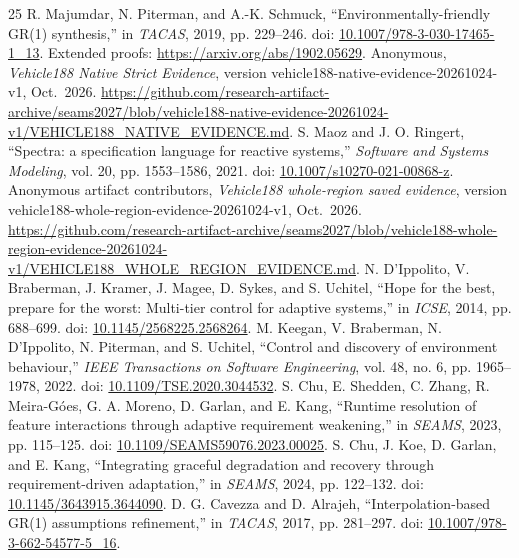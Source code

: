 \begin{thebibliography}{25}
R. Majumdar, N. Piterman, and A.-K. Schmuck, ``Environmentally-friendly GR(1) synthesis,'' in \emph{TACAS}, 2019, pp. 229--246. doi: \href{https://doi.org/10.1007/978-3-030-17465-1_13}{10.1007/978-3-030-17465-1\_13}. Extended proofs: \url{https://arxiv.org/abs/1902.05629}.
Anonymous, \emph{Vehicle188 Native Strict Evidence}, version vehicle188-native-evidence-20261024-v1, Oct.~2026. \url{https://github.com/research-artifact-archive/seams2027/blob/vehicle188-native-evidence-20261024-v1/VEHICLE188_NATIVE_EVIDENCE.md}.
S. Maoz and J. O. Ringert, ``Spectra: a specification language for reactive systems,'' \emph{Software and Systems Modeling}, vol. 20, pp. 1553--1586, 2021. doi: \href{https://doi.org/10.1007/s10270-021-00868-z}{10.1007/s10270-021-00868-z}.
Anonymous artifact contributors, \emph{Vehicle188 whole-region saved evidence}, version vehicle188-whole-region-evidence-20261024-v1, Oct.~2026. \url{https://github.com/research-artifact-archive/seams2027/blob/vehicle188-whole-region-evidence-20261024-v1/VEHICLE188_WHOLE_REGION_EVIDENCE.md}.
N. D'Ippolito, V. Braberman, J. Kramer, J. Magee, D. Sykes, and S. Uchitel, ``Hope for the best, prepare for the worst: Multi-tier control for adaptive systems,'' in \emph{ICSE}, 2014, pp. 688--699. doi: \href{https://doi.org/10.1145/2568225.2568264}{10.1145/2568225.2568264}.
M. Keegan, V. Braberman, N. D'Ippolito, N. Piterman, and S. Uchitel, ``Control and discovery of environment behaviour,'' \emph{IEEE Transactions on Software Engineering}, vol. 48, no. 6, pp. 1965--1978, 2022. doi: \href{https://doi.org/10.1109/TSE.2020.3044532}{10.1109/TSE.2020.3044532}.
S. Chu, E. Shedden, C. Zhang, R. Meira-G\'oes, G. A. Moreno, D. Garlan, and E. Kang, ``Runtime resolution of feature interactions through adaptive requirement weakening,'' in \emph{SEAMS}, 2023, pp. 115--125. doi: \href{https://doi.org/10.1109/SEAMS59076.2023.00025}{10.1109/SEAMS59076.2023.00025}.
S. Chu, J. Koe, D. Garlan, and E. Kang, ``Integrating graceful degradation and recovery through requirement-driven adaptation,'' in \emph{SEAMS}, 2024, pp. 122--132. doi: \href{https://doi.org/10.1145/3643915.3644090}{10.1145/3643915.3644090}.
D. G. Cavezza and D. Alrajeh, ``Interpolation-based GR(1) assumptions refinement,'' in \emph{TACAS}, 2017, pp. 281--297. doi: \href{https://doi.org/10.1007/978-3-662-54577-5_16}{10.1007/978-3-662-54577-5\_16}.

\end{thebibliography}
